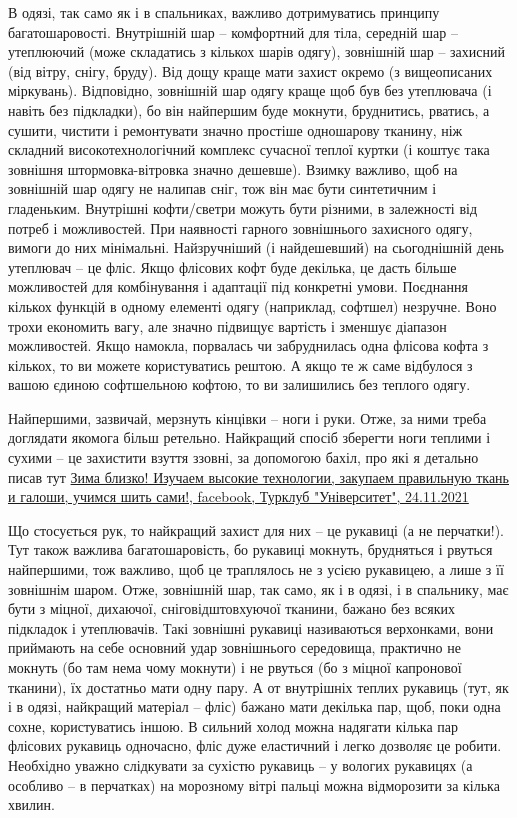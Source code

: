 В одязі, так само як і в спальниках, важливо дотримуватись принципу
багатошаровості. Внутрішній шар – комфортний для тіла, середній шар –
утеплюючий (може складатись з кількох шарів одягу), зовнішній шар – захисний
(від вітру, снігу, бруду). Від дощу краще мати захист окремо (з вищеописаних
міркувань). Відповідно, зовнішній шар одягу краще щоб був без утеплювача (і
навіть без підкладки), бо він найпершим буде мокнути, бруднитись, рватись, а
сушити, чистити і ремонтувати значно простіше одношарову тканину, ніж складний
високотехнологічний комплекс сучасної теплої куртки (і коштує така зовнішня
штормовка-вітровка значно дешевше). Взимку важливо, щоб на зовнішній шар одягу
не налипав сніг, тож він має бути синтетичним і гладеньким. Внутрішні
кофти/светри можуть бути різними, в залежності від потреб і можливостей. При
наявності гарного зовнішнього захисного одягу, вимоги до них мінімальні.
Найзручніший (і найдешевший) на сьогоднішній день утеплювач – це фліс. Якщо
флісових кофт буде декілька, це дасть більше можливостей для комбінування і
адаптації під конкретні умови. Поєднання кількох функцій в одному елементі
одягу (наприклад, софтшел) незручне. Воно трохи економить вагу, але значно
підвищує вартість і зменшує діапазон можливостей. Якщо намокла, порвалась чи
забруднилась одна флісова кофта з кількох, то ви можете користуватись рештою. А
якщо те ж саме відбулося з вашою єдиною софтшельною кофтою, то ви залишились
без теплого одягу.

Найпершими, зазвичай, мерзнуть кінцівки – ноги і руки. Отже, за ними треба
доглядати якомога більш ретельно. Найкращий спосіб зберегти  ноги теплими і
сухими – це захистити взуття ззовні, за допомогою бахіл, про які я детально
писав тут 
\href{https://www.facebook.com/tourclub.universytet/posts/pfbid02DSHgG8cX9N4HfYa9bMEnS4UYahPz2UcFst1ompqQ5RdZ1kfgPRWSn8U3veR8vKLnl}{%
Зима близко! Изучаем высокие технологии, закупаем правильную ткань и галоши, учимся шить сами!, facebook, %
Турклуб "Університет", 24.11.2021%
}

Що стосується рук, то найкращий захист для них – це рукавиці (а не перчатки!).
Тут також важлива багатошаровість, бо рукавиці мокнуть, брудняться і рвуться
найпершими, тож важливо, щоб це траплялось не з усією рукавицею, а лише з її
зовнішнім шаром. Отже, зовнішній шар, так само, як і в одязі, і в спальнику,
має бути з міцної, дихаючої, сніговідштовхуючої тканини, бажано без всяких
підкладок і утеплювачів. Такі зовнішні рукавиці називаються верхонками, вони
приймають на себе основний удар зовнішнього середовища, практично не мокнуть
(бо там нема чому мокнути) і не рвуться (бо з міцної капронової тканини), їх
достатньо мати одну пару. А от внутрішніх теплих рукавиць (тут, як і в одязі,
найкращий матеріал – фліс) бажано мати декілька пар, щоб, поки одна сохне,
користуватись іншою. В сильний холод можна надягати кілька пар флісових
рукавиць одночасно, фліс дуже еластичний і легко дозволяє це робити. Необхідно
уважно слідкувати за сухістю рукавиць – у вологих рукавицях (а особливо – в
перчатках) на морозному вітрі пальці можна відморозити за кілька хвилин.

